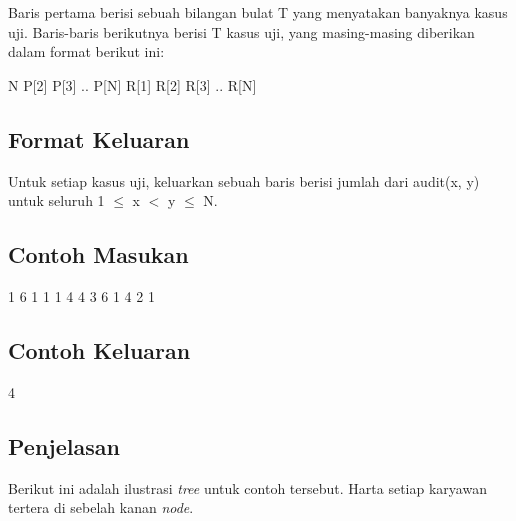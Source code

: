 \documentclass[../main_problemset.tex]{subfiles} %
\begin{document}
Baris pertama berisi sebuah bilangan bulat T yang menyatakan banyaknya kasus uji. Baris-baris berikutnya berisi T kasus uji, yang masing-masing diberikan dalam format berikut ini:

\begin{lcverbatim}
N
P[2] P[3] .. P[N]
R[1] R[2] R[3] .. R[N]
\end{lcverbatim}

\subsection*{Format Keluaran}

Untuk setiap kasus uji, keluarkan sebuah baris berisi jumlah dari audit(x, y) untuk seluruh 1 $ \le $ x $ < $ y $ \le $ N.

\vspace{.4cm}

\begin{minipage}[t]{0.5\textwidth}
\subsection*{Contoh Masukan}

\begin{lcverbatim}
1
6
1 1 1 4 4
3 6 1 4 2 1
\end{lcverbatim}
\end{minipage}
\begin{minipage}[t]{0.5\textwidth}
\subsection*{Contoh Keluaran}

\begin{lcverbatim}
4
\end{lcverbatim}
\end{minipage}

\pagebreak
\subsection*{Penjelasan}

Berikut ini adalah ilustrasi \textit{tree} untuk contoh tersebut. Harta setiap karyawan tertera di sebelah kanan \textit{node}.
\end{document}
